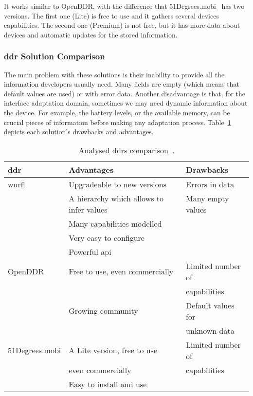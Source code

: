 
It works similar to OpenDDR, with the difference that 51Degrees.mobi~\citep{51degrees}
has two versions. The first one (Lite) is free to use and it gathers several 
devices capabilities. The second one (Premium) is not free, but it has more data 
about devices and automatic updates for the stored information. 


\subsubsection{\ac{ddr} Solution Comparison}
\label{sec:ddr_comparison}

The main problem with these solutions is their inability to provide all the
information developers usually need. Many fields are empty (which means that
default values are used) or with error data. Another disadvantage is that, for
the interface adaptation domain, sometimes we may need dynamic information about
the device. For example, the battery levels, or the available memory, can be
crucial pieces of information before making any adaptation process. Table~\ref{tbl:ddr_comparison}
depicts each solution's drawbacks and advantages.


\begin{table}
\caption{Analysed \ac{ddr}s comparison~\citep{ddr_comparison}.}
\label{tbl:ddr_comparison}
\footnotesize
\centering
\begin{tabular}{l l l}
\hline
 \textbf{\ac{ddr}} 	& \textbf{Advantages} 			& \textbf{Drawbacks}  	\\
\hline
  \ac{wurfl} 	& Upgradeable to new versions 			& Errors in data 	\\
		& A hierarchy which allows to infer values 	& Many empty values	\\
		& Many capabilities modelled 			& 			\\
		& Very easy to configure 			& 			\\
		& Powerful \ac{api} 				&			\\
  OpenDDR 	& Free to use, even commercially 		& Limited number of 	\\
		&		 				& capabilities		\\
		& Growing community 				& Default values for 	\\
		& 						& unknown data 		\\
  51Degrees.mobi& A Lite version, free to use 			& Limited number of 	\\
		& even commercially 				& capabilities		\\
		& Easy to install and use 			&			\\
\hline
\end{tabular}
\end{table}

